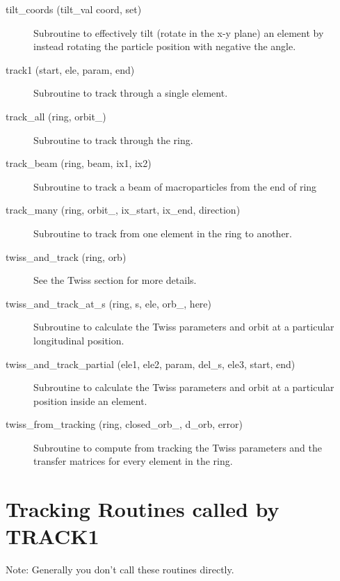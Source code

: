 \begin{description}
\item[tilt\_coords (tilt\_val coord, set)] \Newline
Subroutine to effectively tilt (rotate in the x-y plane) an element by 
instead rotating the particle position with negative the angle. 

\item[track1 (start, ele, param, end)] \Newline
Subroutine to track through a single element. 

\item[track\_all (ring, orbit\_)] \Newline
Subroutine to track through the ring. 

\item[track\_beam (ring, beam, ix1, ix2)] \Newline 
     Subroutine to track a beam of macroparticles from the end of
     ring%

\item[track\_many (ring, orbit\_, ix\_start, ix\_end, direction)] \Newline
Subroutine to track from one element in the ring to another. 

\item[twiss\_and\_track (ring, orb)] \Newline
See the Twiss section for more details. 

\item[twiss\_and\_track\_at\_s (ring, s, ele, orb\_, here)] \Newline
Subroutine to calculate the Twiss parameters and orbit at a particular longitudinal position. 

\item[twiss\_and\_track\_partial (ele1, ele2, param, del\_s, ele3, start, end)] \Newline
Subroutine to calculate the Twiss parameters and orbit at a particular position inside an element. 

\item[twiss\_from\_tracking (ring, closed\_orb\_, d\_orb, error)] \Newline
Subroutine to compute from tracking the Twiss parameters and the transfer matrices 
for every element in the ring. 

\end{description}

\section{Tracking Routines called by TRACK1}
\label{r:track1}   

Note: Generally you don't call these routines directly.

